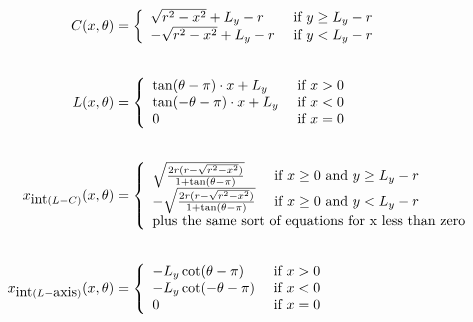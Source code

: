 \documentclass{article}
\begin{document}
\begin{align}
C(x,\theta)&=\left\{\begin{array}{ll}\sqrt{r^2-x^2}+L_y-r&\mbox{ if } y\geq L_y-r\\-\sqrt{r^2-x^2}+L_y-r&\mbox{ if } y<L_y-r\end{array}\right.\\[2em]
L(x,\theta)&=\left\{\begin{array}{ll}\tan(\theta-\pi)\cdot x+L_y&\mbox{ if } x>0\\\tan(-\theta-\pi)\cdot x+L_y&\mbox{ if } x<0\\
0&\mbox{ if }x=0\end{array}\right.\\[2em]
x_{\mbox{int}(L-C)}(x,\theta)&=\left\{\begin{array}{ll}
\sqrt{\frac{2r(r-\sqrt{r^2-x^2})}{1+\tan(\theta-\pi)}}&\mbox{ if } x\geq0\mbox{ and }y\geq L_y-r\\
-\sqrt{\frac{2r(r-\sqrt{r^2-x^2})}{1+\tan(\theta-\pi)}}&\mbox{ if } x\geq0\mbox{ and }y<L_y-r\\
\multicolumn{2}{l}{\mbox{plus the same sort of equations for x less than zero}}
\end{array}\right.\\[2em]
x_{\mbox{int}(L-\mbox{axis})}(x,\theta)&=\left\{\begin{array}{ll}
-L_y\cot(\theta-\pi)&\mbox{ if } x>0\\
-L_y\cot(-\theta-\pi)&\mbox{ if } x<0\\
0&\mbox{ if }x=0
\end{array}\right.
\end{align}
\end{document}
